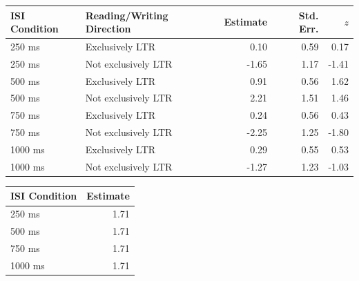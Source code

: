 \documentclass[A4paper,man,floatsintext]{apa6}
\theoremstyle{definition}
\theoremstyle{definition}
\theoremstyle{definition}
\theoremstyle{remark}
\begin{document}
\begin{appendix}
\begin{table}[!p]
\begin{subtable}{\textwidth}
\begin{table}[H]
\begin{tabular}{llrrr}
\toprule
ISI Condition &  Reading/Writing Direction & Estimate & Std. Err. & $z$\\
\midrule
250  ms & Exclusively LTR & 0.10 & 0.59 & 0.17\\
250  ms & Not exclusively LTR & -1.65 & 1.17 & -1.41\\
500  ms & Exclusively LTR & 0.91 & 0.56 & 1.62\\
500  ms & Not exclusively LTR & 2.21 & 1.51 & 1.46\\
750  ms & Exclusively LTR & 0.24 & 0.56 & 0.43\\
750  ms & Not exclusively LTR & -2.25 & 1.25 & -1.80\\
1000 ms & Exclusively LTR & 0.29 & 0.55 & 0.53\\
1000 ms & Not exclusively LTR & -1.27 & 1.23 & -1.03\\
\bottomrule
\end{tabular}\endgroup{}
\end{table}
\end{subtable}
\begin{subtable}{\textwidth}
\caption{Variance Component Estimates. Estimates are presented on the standard deviation scale. 10\% of the variance is estimated to be at the lab-level and 90\% at the group-level.}
\centering
\begin{table}[H]\centering\begingroup\fontsize{10}{12}\selectfont

\begin{tabular}{lr}
\toprule
ISI Condition & Estimate\\
\midrule
250 ms & 1.71\\
500 ms & 1.71\\
750 ms & 1.71\\
1000 ms & 1.71\\
\bottomrule
\end{tabular}\endgroup{}
\end{table}
\end{subtable}
\end{table}

\begin{table}


\end{table}
\end{appendix}
\end{document}
